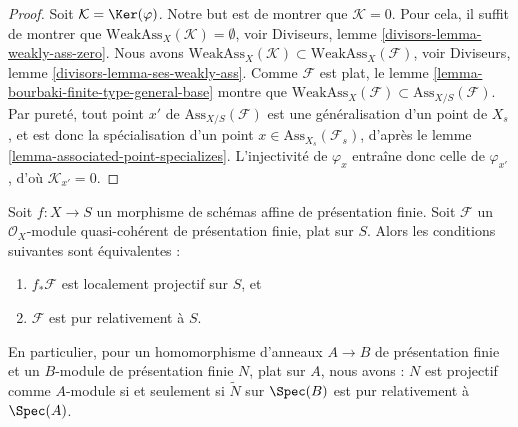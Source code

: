 \begin{proof}
Soit $\mathcal{K} = \Ker(\varphi)$. Notre but est de montrer que
$\mathcal{K} = 0$. Pour cela, il suffit de montrer que
$\text{WeakAss}_X(\mathcal{K}) = \emptyset$, voir
Diviseurs, lemme \ref{divisors-lemma-weakly-ass-zero}.
Nous avons
$\text{WeakAss}_X(\mathcal{K}) \subset \text{WeakAss}_X(\mathcal{F})$, voir
Diviseurs, lemme \ref{divisors-lemma-ses-weakly-ass}.
Comme $\mathcal{F}$ est plat, le
lemme \ref{lemma-bourbaki-finite-type-general-base}
montre que $\text{WeakAss}_X(\mathcal{F}) \subset \text{Ass}_{X/S}(\mathcal{F})$.
Par pureté, tout point $x'$ de $\text{Ass}_{X/S}(\mathcal{F})$
est une généralisation d'un point de $X_s$, et est donc la
spécialisation d'un point $x \in \text{Ass}_{X_s}(\mathcal{F}_s)$, d'après le
lemme \ref{lemma-associated-point-specializes}.
L'injectivité de $\varphi_x$ entraîne donc celle de
$\varphi_{x'}$, d'où $\mathcal{K}_{x'} = 0$.
\end{proof}

\begin{proposition}
\label{proposition-finite-presentation-flat-pure-is-projective}
Soit $f : X \to S$ un morphisme de schémas affine de présentation finie.
Soit $\mathcal{F}$ un $\mathcal{O}_X$-module quasi-cohérent de
présentation finie, plat sur $S$. Alors les conditions suivantes
sont équivalentes :
\begin{enumerate}
\item $f_*\mathcal{F}$ est localement projectif sur $S$, et
\item $\mathcal{F}$ est pur relativement à $S$.
\end{enumerate}
En particulier, pour un homomorphisme d'anneaux $A \to B$ de présentation finie et
un $B$-module de présentation finie $N$, plat sur $A$, nous avons :
$N$ est projectif comme $A$-module si et seulement si $\widetilde{N}$
sur $\Spec(B)$ est pur relativement à $\Spec(A)$.
\end{proposition}

